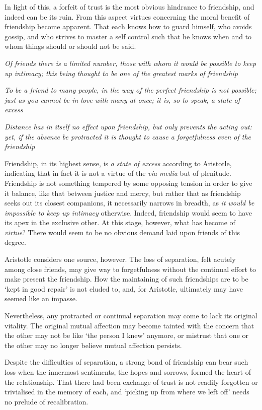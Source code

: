 \documentclass[a4paper,10pt]{article}
\begin{document}
In light of this, a forfeit of trust is the most obvious hindrance to friendship, and indeed can be its ruin. From this aspect virtues concerning the moral benefit of friendship become apparent. That each knows how to guard himself, who avoids gossip, and who strives to master a self control such that he knows when and to whom things should or should not be said.


\epigraph{\textit{Of friends there is a limited number, those with whom it would be possible to keep up intimacy; this being thought to be one of the greatest marks of friendship}}{}
\vspace{-8mm}
\epigraph{\textit{To be a friend to many people, in the way of the perfect friendship is not possible; just as you cannot be in love with many at once; it is, so to speak, a state of excess}}{}
\vspace{-8mm}
\epigraph{\textit{Distance has in itself no effect upon friendship, but only prevents the acting out: yet, if the absence be protracted it is thought to cause a forgetfulness even of the friendship}}{}

Friendship, in its highest sense, is \emph{a state of excess} according to Aristotle, indicating that in fact it is not a virtue of the \emph{via media} but of plenitude. Friendship is not something tempered by some opposing tension in order to give it balance, like that between justice and mercy, but rather that as friendship seeks out its closest companions, it necessarily narrows in breadth, as \emph{it would be impossible to keep up intimacy} otherwise. Indeed, friendship would seem to have its apex in the exclusive other. At this stage, however, what has become of \emph{virtue}? There would seem to be no obvious demand laid upon friends of this degree.

Aristotle considers one source, however. The loss of separation, felt acutely among close friends, may give way to forgetfulness without the continual effort to make present the friendship. How the maintaining of such friendships are to be `kept in good repair' is not eluded to, and, for Aristotle, ultimately may have seemed like an impasse.

Nevertheless, any protracted or continual separation may come to lack its original vitality. The original mutual affection may become tainted with the concern that the other may not be like `the person I knew' anymore, or mistrust that one or the other may no longer believe mutual affection persists.

Despite the difficulties of separation, a strong bond of friendship can bear such loss when the innermost sentiments, the hopes and sorrows, formed the heart of the relationship. That there had been exchange of trust is not readily forgotten or trivialised in the memory of each, and `picking up from where we left off' needs no prelude of recalibration.
\end{document}
